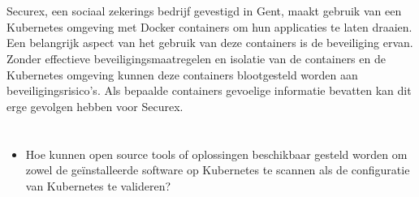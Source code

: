 
\section{}%
\label{sec:probleemstelling}

Securex, een sociaal zekerings bedrijf gevestigd in Gent, maakt gebruik van een Kubernetes omgeving met Docker containers om hun applicaties te laten draaien. Een belangrijk aspect van het gebruik van deze containers is de beveiliging ervan. Zonder effectieve beveiligingsmaatregelen en isolatie van de containers en de Kubernetes omgeving kunnen deze containers blootgesteld worden aan beveiligingsrisico's. Als bepaalde containers gevoelige informatie bevatten kan dit erge gevolgen hebben voor Securex.


\section{}%
\label{sec:onderzoeksvraag}

\begin{itemize}
    \item Hoe kunnen open source tools of oplossingen beschikbaar gesteld worden om zowel de geïnstalleerde software op Kubernetes te scannen als de configuratie van Kubernetes te valideren?
\end{itemize}


